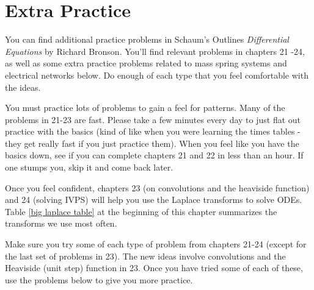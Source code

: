 
\section*{Extra Practice}

You can find additional practice problems in Schaum's Outlines \textit{Differential Equations} by Richard Bronson.
You'll find relevant problems in chapters 21 -24, as well as some extra practice problems related to mass spring systems and electrical networks below.
Do enough of each type that you feel comfortable with the ideas. 

You must practice lots of problems to gain a feel for patterns.  Many of the problems in 21-23 are fast. Please take a few minutes every day to just flat out practice with the basics (kind of like when you were learning the times tables - they get really fast if you just practice them). When you feel like you have the basics down, see if you can complete chapters 21 and 22 in less than an hour. If one stumps you, skip it and come back later.  

Once you feel confident, chapters 23 (on convolutions and the heaviside function) and 24 (solving IVPS) will help you use the Laplace transforms to solve ODEs. Table \ref{big laplace table}  at the beginning of this chapter summarizes the transforms we use most often.

Make sure you try some of each type of problem from chapters 21-24 (except for the last set of problems in 23).  The new ideas involve convolutions and the Heaviside (unit step) function in 23.  Once you have tried some of each of these, use the problems below to give you more practice.  


